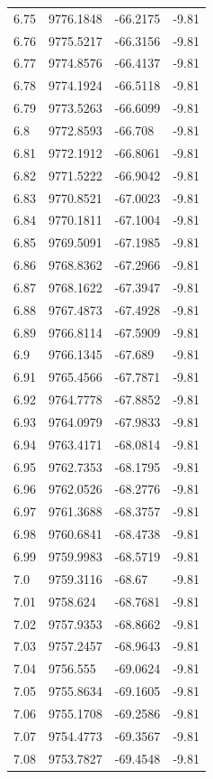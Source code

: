 \begin{table}[H]
\begin{tabular}{llll}
6.75 & 9776.1848 & -66.2175 & -9.81 \\
6.76 & 9775.5217 & -66.3156 & -9.81 \\
6.77 & 9774.8576 & -66.4137 & -9.81 \\
6.78 & 9774.1924 & -66.5118 & -9.81 \\
6.79 & 9773.5263 & -66.6099 & -9.81 \\
6.8 & 9772.8593 & -66.708 & -9.81 \\
6.81 & 9772.1912 & -66.8061 & -9.81 \\
6.82 & 9771.5222 & -66.9042 & -9.81 \\
6.83 & 9770.8521 & -67.0023 & -9.81 \\
6.84 & 9770.1811 & -67.1004 & -9.81 \\
6.85 & 9769.5091 & -67.1985 & -9.81 \\
6.86 & 9768.8362 & -67.2966 & -9.81 \\
6.87 & 9768.1622 & -67.3947 & -9.81 \\
6.88 & 9767.4873 & -67.4928 & -9.81 \\
6.89 & 9766.8114 & -67.5909 & -9.81 \\
6.9 & 9766.1345 & -67.689 & -9.81 \\
6.91 & 9765.4566 & -67.7871 & -9.81 \\
6.92 & 9764.7778 & -67.8852 & -9.81 \\
6.93 & 9764.0979 & -67.9833 & -9.81 \\
6.94 & 9763.4171 & -68.0814 & -9.81 \\
6.95 & 9762.7353 & -68.1795 & -9.81 \\
6.96 & 9762.0526 & -68.2776 & -9.81 \\
6.97 & 9761.3688 & -68.3757 & -9.81 \\
6.98 & 9760.6841 & -68.4738 & -9.81 \\
6.99 & 9759.9983 & -68.5719 & -9.81 \\
7.0 & 9759.3116 & -68.67 & -9.81 \\
7.01 & 9758.624 & -68.7681 & -9.81 \\
7.02 & 9757.9353 & -68.8662 & -9.81 \\
7.03 & 9757.2457 & -68.9643 & -9.81 \\
7.04 & 9756.555 & -69.0624 & -9.81 \\
7.05 & 9755.8634 & -69.1605 & -9.81 \\
7.06 & 9755.1708 & -69.2586 & -9.81 \\
7.07 & 9754.4773 & -69.3567 & -9.81 \\
7.08 & 9753.7827 & -69.4548 & -9.81 \\

\end{tabular}
\end{table}
